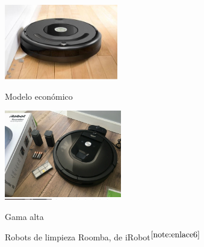 \begin{figure}[ht!]
	\centering
	\begin{minipage}{0.3\linewidth}
		\centering
		\includegraphics[width=\linewidth]{figs/gama-baja.png}
		\caption*{\centering Modelo económico }
	\end{minipage}
	\hspace{3cm}
	\begin{minipage}{0.3\linewidth}
		\centering
		\includegraphics[width=\linewidth]{figs/gama-alta.png}
		\caption*{\centering Gama alta}
	\end{minipage}
	\caption{Robots de limpieza Roomba, de iRobot$^{\ref{note:enlace6}}$}
	\label{fig:roblimpieza}
\end{figure}

\setcounter{footnote}{6} %

